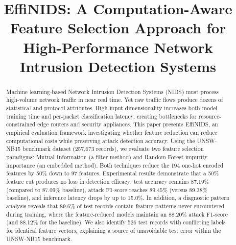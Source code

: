 \documentclass[conference]{IEEEtran}
\begin{document}
\title{EffiNIDS: A Computation-Aware Feature Selection Approach for High-Performance Network Intrusion Detection Systems}

\author{
}

\maketitle

\begin{abstract}
Machine learning-based Network Intrusion Detection Systems (NIDS) must process high-volume network traffic in near real time. Yet raw traffic flows produce dozens of statistical and protocol attributes. High input dimensionality increases both model training time and per-packet classification latency, creating bottlenecks for resource-constrained edge routers and security appliances. This paper presents EffiNIDS, an empirical evaluation framework investigating whether feature reduction can reduce computational costs while preserving attack detection accuracy. Using the UNSW-NB15 benchmark dataset (257,673 records), we evaluate two feature selection paradigms: Mutual Information (a filter method) and Random Forest impurity importance (an embedded method). Both techniques reduce the 194 one-hot encoded features by 50\% down to 97 features. Experimental results demonstrate that a 50\% feature cut produces no loss in detection efficacy: test accuracy remains 87.19\% (compared to 87.09\% baseline), attack F1-score reaches 89.45\% (versus 89.38\% baseline), and inference latency drops by up to 15.0\%. In addition, a diagnostic pattern analysis reveals that 89.6\% of test records contain feature patterns never encountered during training, where the feature-reduced models maintain an 88.20\% attack F1-score (and 88.12\% for the baseline). We also identify 526 test records with conflicting labels for identical feature vectors, explaining a source of unavoidable test error within the UNSW-NB15 benchmark.
\end{abstract}
\end{document}
